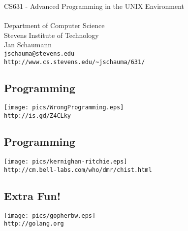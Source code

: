 \documentclass[xga]{xdvislides}
\begin{document}
\setfontphv

\lhead{\slidetitle}
\cfoot{\relax}
\rfoot{\Gray{\today}}

\vspace*{\fill}
\begin{center}
	\Hugesize
		CS631 - Advanced Programming in the UNIX Environment\\ [1em]
	\hspace*{5mm}\blueline\\ [1em]
	\Normalsize
		Department of Computer Science\\
		Stevens Institute of Technology\\
		Jan Schaumann\\
		\verb+jschauma@stevens.edu+\\
		\verb+http://www.cs.stevens.edu/~jschauma/631/+
\end{center}
\vspace*{\fill}

\subsection{Programming}
\begin{center}
\texttt{[image: pics/WrongProgramming.eps]} \\
\verb+http://is.gd/Z4CLky+
\end{center}

\subsection{Programming}
\begin{center}
\texttt{[image: pics/kernighan-ritchie.eps]} \\
\verb+http://cm.bell-labs.com/who/dmr/chist.html+
\end{center}

\subsection{Extra Fun!}
\vspace*{\fill}
\begin{center}
\texttt{[image: pics/gopherbw.eps]} \\
\verb+http://golang.org+
\end{center}
\vspace*{\fill}
\end{document}
